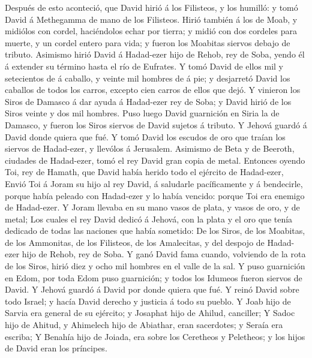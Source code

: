  Después de esto aconteció, que David hirió á los
Filisteos, y los humilló: y tomó David á Methegamma de mano de los
Filisteos.  Hirió también á los de Moab, y midiólos con
cordel, haciéndolos echar por tierra; y midió con dos cordeles para
muerte, y un cordel entero para vida; y fueron los Moabitas siervos
debajo de tributo.  Asimismo hirió David á Hadad-ezer hijo
de Rehob, rey de Soba, yendo él á extender su término hasta el río de
Eufrates.  Y tomó David de ellos mil y setecientos de á
caballo, y veinte mil hombres de á pie; y desjarretó David los caballos
de todos los carros, excepto cien carros de ellos que dejó.
 Y vinieron los Siros de Damasco á dar ayuda á Hadad-ezer
rey de Soba; y David hirió de los Siros veinte y dos mil hombres.
 Puso luego David guarnición en Siria la de Damasco, y
fueron los Siros siervos de David sujetos á tributo. Y Jehová guardó á
David donde quiera que fué.  Y tomó David los escudos de
oro que traían los siervos de Hadad-ezer, y llevólos á Jerusalem.
 Asimismo de Beta y de Beeroth, ciudades de Hadad-ezer,
tomó el rey David gran copia de metal.  Entonces oyendo
Toi, rey de Hamath, que David había herido todo el ejército de
Hadad-ezer,  Envió Toi á Joram su hijo al rey David, á
saludarle pacíficamente y á bendecirle, porque había peleado con
Hadad-ezer y lo había vencido: porque Toi era enemigo de Hadad-ezer. Y
Joram llevaba en su mano vasos de plata, y vasos de oro, y de metal;
 Los cuales el rey David dedicó á Jehová, con la plata y
el oro que tenía dedicado de todas las naciones que había sometido:
 De los Siros, de los Moabitas, de los Ammonitas, de los
Filisteos, de los Amalecitas, y del despojo de Hadad-ezer hijo de Rehob,
rey de Soba.  Y ganó David fama cuando, volviendo de la
rota de los Siros, hirió diez y ocho mil hombres en el valle de la sal.
 Y puso guarnición en Edom, por toda Edom puso
guarnición; y todos los Idumeos fueron siervos de David. Y Jehová guardó
á David por donde quiera que fué.  Y reinó David sobre
todo Israel; y hacía David derecho y justicia á todo su pueblo.
 Y Joab hijo de Sarvia era general de su ejército; y
Josaphat hijo de Ahilud, canciller;  Y Sadoc hijo de
Ahitud, y Ahimelech hijo de Abiathar, eran sacerdotes; y Seraía era
escriba;  Y Benahía hijo de Joiada, era sobre los
Ceretheos y Peletheos; y los hijos de David eran los príncipes.

